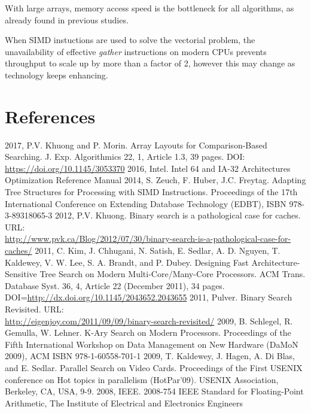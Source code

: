 \documentclass[preprint,1p,times]{elsarticle}
\begin{document}
With large arrays, memory access speed is the bottleneck for all algorithms, as already found in previous studies.

When SIMD instuctions are used to solve the vectorial problem, the unavailability of effective \textit{gather} instructions on modern CPUs prevents throughput to scale up by more than a factor of 2, however this may change as technology keeps enhancing. 




\section{References}
\begin{thebibliography}{9}
 2017, P.V. Khuong and P. Morin. Array Layouts for Comparison-Based Searching. J. Exp. Algorithmics 22, 1, Article 1.3, 39 pages. DOI: \url{https://doi.org/10.1145/3053370}
 2016, Intel. Intel 64 and IA-32 Architectures Optimization Reference Manual
 2014, S. Zeuch, F. Huber, J.C. Freytag. Adapting Tree Structures for Processing with SIMD Instructions. Proceedings of the 17th International Conference on Extending Database Technology (EDBT), ISBN 978-3-89318065-3
 2012, P.V. Khuong. Binary search is a pathological case for caches. URL:\\
\url{http://www.pvk.ca/Blog/2012/07/30/binary-search-is-a-pathological-case-for-caches/}
 2011, C. Kim, J. Chhugani, N. Satish, E. Sedlar, A. D. Nguyen, T. Kaldewey, V. W. Lee, S. A. Brandt, and P. Dubey. Designing Fast Architecture-Sensitive Tree Search on Modern Multi-Core/Many-Core Processors. ACM Trans. Database Syst. 36, 4, Article 22 (December 2011), 34 pages. DOI=\url{http://dx.doi.org/10.1145/2043652.2043655} 
 2011, Pulver. Binary Search Revisited. URL:\\
\url{http://eigenjoy.com/2011/09/09/binary-search-revisited/}
 2009, B. Schlegel, R. Gemulla, W. Lehner. K-Ary Search on Modern Processors. Proceedings of the Fifth International Workshop on Data Management on New Hardware (DaMoN 2009), ACM ISBN 978-1-60558-701-1
 2009, T. Kaldewey, J. Hagen, A. Di Blas, and E. Sedlar. Parallel Search on Video Cards. Proceedings of the First USENIX conference on Hot topics in parallelism (HotPar'09). USENIX Association, Berkeley, CA, USA, 9-9. 
 2008, IEEE. 2008-754 IEEE Standard for Floating-Point Arithmetic, The Institute of Electrical and Electronics Engineers

\end{thebibliography}
\end{document}
